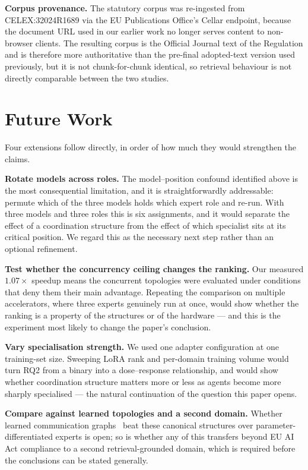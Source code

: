 \documentclass[journal,10pt,compsoc,onecolumn]{IEEEtran}
\begin{document}
\textbf{Corpus provenance.} The statutory corpus was re-ingested from
CELEX:32024R1689 via the EU Publications Office's Cellar endpoint, because the
document URL used in our earlier work no longer serves content to
non-browser clients. The resulting corpus is the Official Journal text of the
Regulation and is therefore more authoritative than the pre-final adopted-text
version used previously, but it is not chunk-for-chunk identical, so retrieval
behaviour is not directly comparable between the two studies.

\section{Future Work}

Four extensions follow directly, in order of how much they would strengthen the
claims.

\textbf{Rotate models across roles.} The model--position confound identified above
is the most consequential limitation, and it is straightforwardly addressable:
permute which of the three models holds which expert role and re-run. With three
models and three roles this is six assignments, and it would separate the effect of
a coordination structure from the effect of which specialist sits at its critical
position. We regard this as the necessary next step rather than an optional
refinement.

\textbf{Test whether the concurrency ceiling changes the ranking.} Our measured
$1.07\times$ speedup means the concurrent topologies were evaluated under
conditions that deny them their main advantage. Repeating the comparison on
multiple accelerators, where three experts genuinely run at once, would show
whether the ranking is a property of the structures or of the hardware --- and
this is the experiment most likely to change the paper's conclusion.

\textbf{Vary specialisation strength.} We used one adapter configuration at one
training-set size. Sweeping LoRA rank and per-domain training volume would turn
RQ2 from a binary into a dose--response relationship, and would show whether
coordination structure matters more or less as agents become more sharply
specialised --- the natural continuation of the question this paper opens.

\textbf{Compare against learned topologies and a second domain.} Whether
learned communication graphs~\cite{zhang2024gdesigner, li2025argdesigner,
zhuge2024gptswarm} beat these canonical structures over parameter-differentiated
experts is open; so is whether any of this transfers beyond EU AI Act compliance
to a second retrieval-grounded domain, which is required before the conclusions
can be stated generally.
\end{document}
